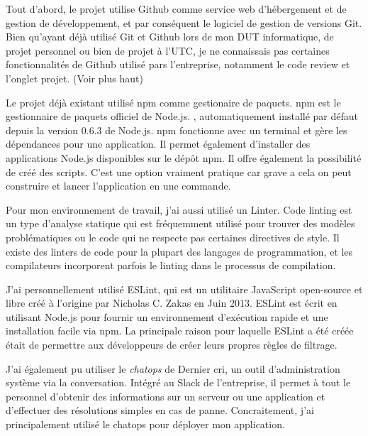 \documentclass[12pt,a4paper]{article}
\begin{document}
  \bigskip

  Tout d'abord, le projet utilise Github comme service web d'hébergement
  et de gestion de développement, et par conséquent le logiciel de gestion
  de versions Git. Bien qu'ayant déjà utilisé Git et Github lors de mon
  DUT informatique, de projet personnel ou bien de projet à l'UTC, je ne
  connaissais pas certaines fonctionnalités de Github utilisé pars
  l'entreprise, notamment le code review et l'onglet projet. (Voir plus
  haut)

  \bigskip

  Le projet déjà existant utilisé npm comme gestionaire de paquets. npm
  est le gestionnaire de paquets officiel de Node.js. , automatiquement
  installé par défaut depuis la version 0.6.3 de Node.js. npm fonctionne
  avec un terminal et gère les dépendances pour une application. Il permet
  également d'installer des applications Node.js disponibles sur le dépôt
  npm. Il offre également la possibilité de créé des scripts. C'est une
  option vraiment pratique car grave a cela on peut construire et lancer
  l'application en une commande.

  \bigskip

  Pour mon environnement de travail, j'ai aussi utilisé un Linter. Code
  linting est un type d'analyse statique qui est fréquemment utilisé pour
  trouver des modèles problématiques ou le code qui ne respecte pas
  certaines directives de style. Il existe des linters de code pour la
  plupart des langages de programmation, et les compilateurs incorporent
  parfois le linting dans le processus de compilation.

  J'ai personnellement utilisé ESLint, qui est un utilitaire JavaScript
  open-source et libre créé à l'origine par Nicholas C. Zakas en Juin
  2013. ESLint est écrit en utilisant Node.js pour fournir un
  environnement d'exécution rapide et une installation facile via npm. La
  principale raison pour laquelle ESLint a été créée était de permettre
  aux développeurs de créer leurs propres règles de filtrage.

  \bigskip

  J'ai également pu utiliser le \emph{chatops} de Dernier cri, un outil
  d'administration système via la conversation. Intégré au Slack de
  l'entreprise, il permet à tout le personnel d'obtenir des informations
  sur un serveur ou une application et d'effectuer des résolutions simples
  en cas de panne. Concraitement, j'ai principalement utilisé le chatops
  pour déployer mon application.
\end{document}
